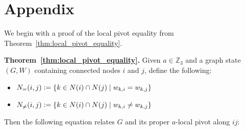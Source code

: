 \documentclass[11pt, oneside]{article}      %
\begin{document}


\section{Appendix}

We begin with a proof of the local pivot equality from Theorem~\ref{thm:local_pivot_equality}.\newline

\textbf{Theorem~\ref{thm:local_pivot_equality}.}
	Given $a \in \mathbb{Z}_3$ and a graph state $(G, W)$ containing connected nodes $i$ and $j$, define the following:
	\begin{itemize}
		\item $N_{=}(i, j) \vcentcolon= \left\{k \in N(i) \cap N(j) \mid w_{k,i} = w_{k,j} \right\}$
		\item $N_{\neq}(i, j) \vcentcolon= \left\{k \in N(i) \cap N(j) \mid w_{k,i} \neq w_{k,j} \right\}$
	\end{itemize} 
	Then the following equation relates $G$ and its proper $a$-local pivot along $ij$:
\end{document}
